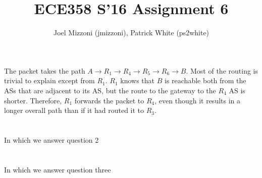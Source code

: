 \documentclass[10pt,a4paper]{article}
\author{Joel Mizzoni (jmizzoni), Patrick White (ps2white)}
\begin{document}
\title{ECE358 S'16 Assignment 6}
\maketitle
\section{}
The packet takes the path $A\rightarrow R_1 \rightarrow R_4 \rightarrow R_5 \rightarrow R_6 \rightarrow B$.
Most of the routing is trivial to explain except from $R_1$.
$R_1$ knows that $B$ is reachable both from the ASs that are adjacent to its AS, but the route to the gateway to the $R_4$ AS is shorter.
Therefore, $R_1$ forwards the packet to $R_4$, even though it results in a longer overall path than if it had routed it to $R_3$.
\section{}
In which we answer question 2
\section{}
In which we answer question three
\end{document}
